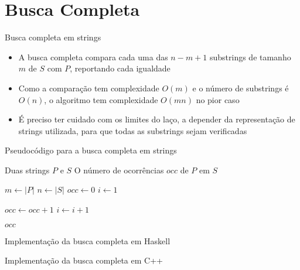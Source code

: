 \section{Busca Completa}


\begin{frame}[fragile]{Busca completa em strings}

    \begin{itemize}
        \item A busca completa compara cada uma das $n - m + 1$ substrings de tamanho $m$ de $S$ 
            com $P$, reportando cada igualdade
        \pause

        \item Como a comparação tem complexidade $O(m)$ e o número de substrings é $O(n)$, o 
            algoritmo tem complexidade $O(mn)$ no pior caso
        \pause

        \item É preciso ter cuidado com os limites do laço, a depender da representação de 
            strings utilizada, para que todas as substrings sejam verificadas
    \end{itemize}

\end{frame}

\begin{frame}[fragile]{Pseudocódigo para a busca completa em strings}

    \begin{algorithm}[H]
        \caption{Busca completa em Strings}
        \begin{algorithmic}[1]
            \Require Duas strings $P$ e $S$
            \Ensure O número de ocorrências $occ$ de $P$ em $S$

                \State $m \gets |P|$
                \State $n \gets |S|$
                \State $occ \gets 0$
                \State $i \gets 1$

                        \State $occ \gets occ + 1$
                    \EndIf
                    \State $i \gets i + 1$
                \EndWhile

                \State \Return $occ$
            \EndFunction
        \end{algorithmic}
    \end{algorithm}

\end{frame}

\begin{frame}[fragile]{Implementação da busca completa em Haskell}
\end{frame}

\begin{frame}[fragile]{Implementação da busca completa em C++}
\end{frame}
